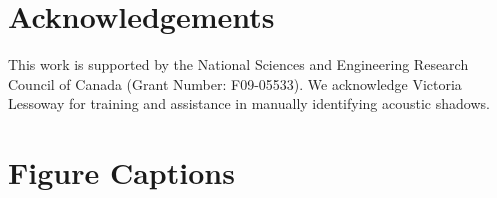 \documentclass[authoryear,preprint,review,12pt]{elsarticle}
\begin{document}
        
\section*{Acknowledgements}
\label{Ack}
This work is supported by the National Sciences and Engineering Research Council of Canada (Grant Number: F09-05533). We acknowledge Victoria Lessoway for training and assistance in manually identifying acoustic shadows.







\pagebreak







\pagebreak

\section*{Figure Captions}
\end{document}
